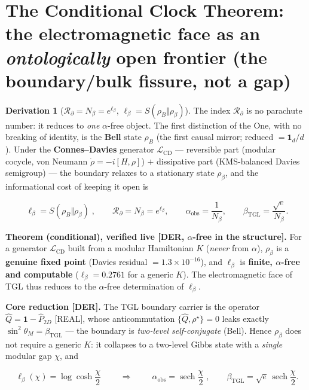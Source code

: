 \documentclass[11pt]{article}
\newcommand{\bTGL}{\beta_{\mathrm{TGL}}}\newcommand{\Msun}{M_{\odot}}\newcommand{\TGL}{\mathrm{TGL}}
\theoremstyle{definition}\newtheorem{deriv}{Derivation}
\begin{document}
\section{The Conditional Clock Theorem: the electromagnetic face as an \emph{ontologically} open frontier (the boundary/bulk fissure, not a gap)}

\begin{deriv}[$\mathcal{R}_\partial=N_\beta=e^{\ell_\beta}$, $\ell_\beta=S(\rho_B\Vert\rho_\beta)$]

The index $\mathcal{R}_\partial$ is no parachute number: it reduces to \emph{one} $\alpha$-free object. The first distinction of the One, with no breaking of identity, is the \textbf{Bell} state $\rho_B$ (the first causal mirror; reduced $=\mathbf 1_d/d$). Under the \textbf{Connes--Davies} generator $\mathcal{L}_{\mathrm{CD}}$ --- reversible part (modular cocycle, von Neumann $\dot\rho=-i[H,\rho]$) $+$ dissipative part (KMS-balanced Davies semigroup) --- the boundary relaxes to a stationary state $\rho_\beta$, and the informational cost of keeping it open is

\begin{equation}\boxed{\;\ell_\beta=S(\rho_B\Vert\rho_\beta)\;},\qquad \mathcal{R}_\partial=N_\beta=e^{\ell_\beta},\qquad \alpha_{\mathrm{obs}}=\frac{1}{N_\beta},\qquad \bTGL=\frac{\sqrt e}{N_\beta}.\end{equation}

\textbf{Theorem (conditional), verified live \textsf{[DER, $\alpha$-free in the structure]}.} For a generator $\mathcal{L}_{\mathrm{CD}}$ built from a modular Hamiltonian $K$ (\emph{never} from $\alpha$), $\rho_\beta$ is a \textbf{genuine fixed point} (Davies residual $=1.3\times10^{-16}$), and $\ell_\beta$ is \textbf{finite, $\alpha$-free and computable} ($\ell_\beta=0.2761$ for a generic $K$). The electromagnetic face of TGL thus reduces to the $\alpha$-free determination of $\ell_\beta$.

\textbf{Core reduction \textsf{[DER]}.} The TGL boundary carrier is the operator $\hat Q=\mathbf 1-\hat P_{2D}$ \textsf{[REAL]}, whose anticommutation $\{\hat Q,\rho^\star\}=0$ leaks exactly $\sin^2\theta_M=\bTGL$ --- the boundary is \emph{two-level self-conjugate} (Bell). Hence $\rho_\beta$ does not require a generic $K$: it collapses to a two-level Gibbs state with a \emph{single} modular gap $\chi$, and

\begin{equation}\boxed{\;\ell_\beta(\chi)=\log\cosh\frac{\chi}{2}\;}\qquad\Longrightarrow\qquad\boxed{\;\alpha_{\mathrm{obs}}=\operatorname{sech}\frac{\chi}{2}\;},\qquad \bTGL=\sqrt e\,\operatorname{sech}\frac{\chi}{2}.\end{equation}


\end{deriv}
\end{document}
